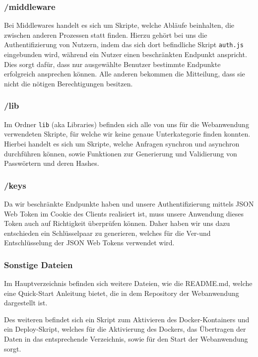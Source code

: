 \subsubsection*{/middleware}
Bei Middlewares handelt es sich um Skripte, welche Abläufe beinhalten, die zwischen anderen Prozessen statt finden. Hierzu gehört bei uns die Authentifizierung von Nutzern, indem das sich dort befindliche Skript \verb|auth.js| eingebunden wird, während ein Nutzer einen beschränkten Endpunkt anspricht. Dies sorgt dafür, dass nur ausgewählte Benutzer bestimmte Endpunkte erfolgreich ansprechen können. Alle anderen bekommen die Mitteilung, dass sie nicht die nötigen Berechtigungen besitzen.

\subsubsection*{/lib}
Im Ordner \verb|lib| (aka Libraries) befinden sich alle von uns für die Webanwendung verwendeten Skripte, für welche wir keine genaue Unterkategorie finden konnten. Hierbei handelt es sich um Skripte, welche Anfragen synchron und asynchron durchführen können, sowie Funktionen zur Generierung und Validierung von Passwörtern und deren Hashes.

\subsubsection*{/keys}
Da wir beschränkte Endpunkte haben und unsere Authentifizierung mittels JSON Web Token im Cookie des Clients realisiert ist, muss unsere Anwendung dieses Token auch auf Richtigkeit überprüfen können. Daher haben wir uns dazu entschieden ein Schlüsselpaar zu generieren, welches für die Ver-und Entschlüsselung der JSON Web Tokens verwendet wird.\\

\subsubsection*{Sonstige Dateien}
\label{sec:node-other-files}
Im Hauptverzeichnis befinden sich weitere Dateien, wie die README.md, welche eine Quick-Start Anleitung bietet, die in dem Repository der Webanwendung dargestellt ist.

Des weiteren befindet sich ein Skript zum Aktivieren des Docker-Kontainers und ein Deploy-Skript, welches für die Aktivierung des Dockers, das Übertragen der Daten in das entsprechende Verzeichnis, sowie für den Start der Webanwendung sorgt.

